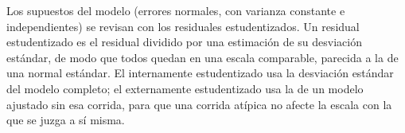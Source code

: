 Los supuestos del modelo (errores normales, con varianza constante e independientes) se revisan con los residuales estudentizados. Un residual estudentizado es el residual dividido por una estimación de su desviación estándar, de modo que todos quedan en una escala comparable, parecida a la de una normal estándar. El internamente estudentizado usa la desviación estándar del modelo completo; el externamente estudentizado usa la de un modelo ajustado sin esa corrida, para que una corrida atípica no afecte la escala con la que se juzga a sí misma.
